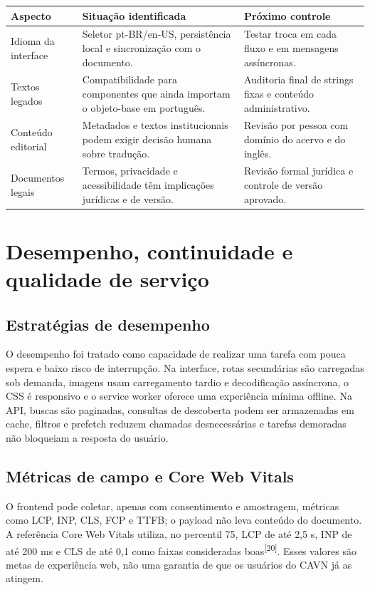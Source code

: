 \documentclass[11pt,a4paper]{article}
\newcommand{\sourcecite}[1]{\textsuperscript{[#1]}}
\begin{document}
\begin{longtable}{P{0.27\textwidth}P{0.41\textwidth}P{0.22\textwidth}}
\toprule
\textbf{Aspecto} & \textbf{Situação identificada} & \textbf{Próximo controle} \\
\midrule
\endhead
\bottomrule
\endfoot
Idioma da interface & Seletor pt-BR/en-US, persistência local e sincronização com o documento. & Testar troca em cada fluxo e em mensagens assíncronas. \\
Textos legados & Compatibilidade para componentes que ainda importam o objeto-base em português. & Auditoria final de strings fixas e conteúdo administrativo. \\
Conteúdo editorial & Metadados e textos institucionais podem exigir decisão humana sobre tradução. & Revisão por pessoa com domínio do acervo e do inglês. \\
Documentos legais & Termos, privacidade e acessibilidade têm implicações jurídicas e de versão. & Revisão formal jurídica e controle de versão aprovado. \\
\end{longtable}

\section{Desempenho, continuidade e qualidade de serviço}

\subsection{Estratégias de desempenho}

O desempenho foi tratado como capacidade de realizar uma tarefa com pouca espera e baixo risco de interrupção. Na interface, rotas secundárias são carregadas sob demanda, imagens usam carregamento tardio e decodificação assíncrona, o CSS é responsivo e o service worker oferece uma experiência mínima offline. Na API, buscas são paginadas, consultas de descoberta podem ser armazenadas em cache, filtros e prefetch reduzem chamadas desnecessárias e tarefas demoradas não bloqueiam a resposta do usuário.

\subsection{Métricas de campo e Core Web Vitals}

O frontend pode coletar, apenas com consentimento e amostragem, métricas como LCP, INP, CLS, FCP e TTFB; o payload não leva conteúdo do documento. A referência Core Web Vitals utiliza, no percentil 75, LCP de até 2,5 s, INP de até 200 ms e CLS de até 0,1 como faixas consideradas boas\sourcecite{20}. Esses valores são metas de experiência web, não uma garantia de que os usuários do CAVN já as atingem.
\end{document}
